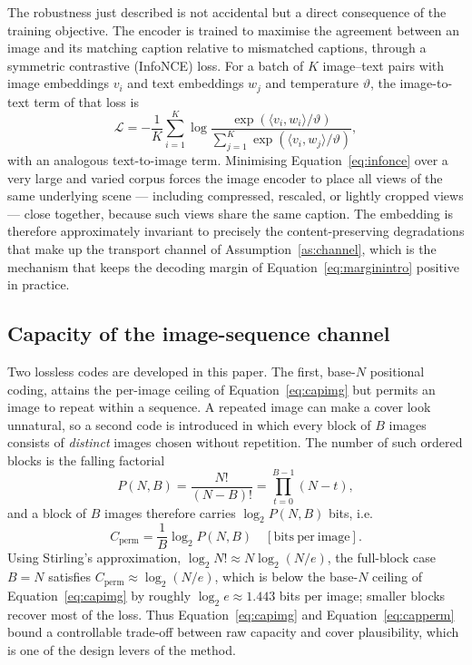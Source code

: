 \documentclass[11pt]{article}
\theoremstyle{definition}
\newcommand{\Eqn}[1]{Equation~\eqref{#1}}
\begin{document}
The robustness just described is not accidental but a direct consequence of the
training objective. The encoder is trained to maximise the agreement between an
image and its matching caption relative to mismatched captions, through a symmetric
contrastive (InfoNCE) loss. For a batch of $K$ image--text pairs with image
embeddings $v_i$ and text embeddings $w_j$ and temperature $\vartheta$, the
image-to-text term of that loss is
\begin{equation}
  \mathcal{L}=-\frac{1}{K}\sum_{i=1}^{K}\log
      \frac{\exp\!\left(\langle v_i,w_i\rangle/\vartheta\right)}
           {\sum_{j=1}^{K}\exp\!\left(\langle v_i,w_j\rangle/\vartheta\right)},
  \label{eq:infonce}
\end{equation}
with an analogous text-to-image term. Minimising \Eqn{eq:infonce} over a very large
and varied corpus forces the image encoder to place all views of the same
underlying scene --- including compressed, rescaled, or lightly cropped views ---
close together, because such views share the same caption. The embedding is
therefore approximately invariant to precisely the content-preserving degradations
that make up the transport channel of Assumption~\ref{as:channel}, which is the
mechanism that keeps the decoding margin of \Eqn{eq:marginintro} positive in
practice.

\subsection{Capacity of the image-sequence channel}\label{sec:capacity}
Two lossless codes are developed in this paper. The first, base-$N$ positional
coding, attains the per-image ceiling of \Eqn{eq:capimg} but permits an image to
repeat within a sequence. A repeated image can make a cover look unnatural, so a
second code is introduced in which every block of $B$ images consists of
\emph{distinct} images chosen without repetition. The number of such ordered
blocks is the falling factorial
\begin{equation}
  P(N,B)=\frac{N!}{(N-B)!}=\prod_{t=0}^{B-1}(N-t),
  \label{eq:pnb}
\end{equation}
and a block of $B$ images therefore carries $\log_2 P(N,B)$ bits, i.e.
\begin{equation}
  C_{\text{perm}}=\frac{1}{B}\log_2 P(N,B)\quad[\mathrm{bits\ per\ image}].
  \label{eq:capperm}
\end{equation}
Using Stirling's approximation, $\log_2 N!\approx N\log_2(N/e)$, the full-block
case $B=N$ satisfies $C_{\text{perm}}\approx\log_2(N/e)$, which is below the
base-$N$ ceiling of \Eqn{eq:capimg} by roughly $\log_2 e\approx 1.443$ bits per
image; smaller blocks recover most of the loss. Thus \Eqn{eq:capimg} and
\Eqn{eq:capperm} bound a controllable trade-off between raw capacity and cover
plausibility, which is one of the design levers of the method.
\end{document}
